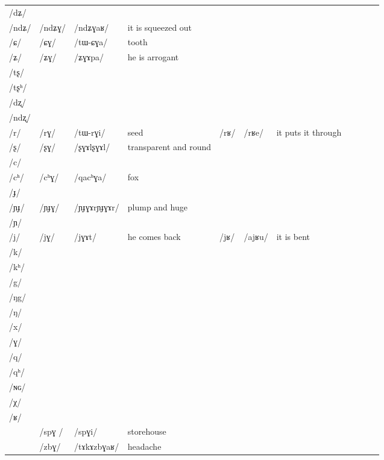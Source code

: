 \documentclass[oldfontcommands,oneside,a4paper,11pt]{article}
\newcommand{\ipa}[1]{{\phon/#1/}} %
\newcommand{\deux}[1]{/#1/}
\newcommand{\trois}[1]{/#1/}
\newcommand{\idph}[1]{\cellcolor{gray}\textbf{#1}}
\begin{document}
\begin{table}
{\begin{tabular}{l|lll|lll|lll|l}
\ipa{dʑ}  	&    	&    	&  	&	&	& \\	
\ipa{ndʑ}  	&  \deux{ndʑɣ}  	&  \ipa{ndʑɣaʁ}  	&  it is squeezed out	&	&	& \\	
\ipa{ɕ}  	&  \deux{ɕɣ}  	&  \ipa{tɯ-ɕɣa}  	&  tooth	&	&	& \\	
\ipa{ʑ}  	&  \deux{ʑɣ}  	&  \ipa{ʑɣɤpa}  	& he is arrogant 	&	&	& \\	
\ipa{tʂ}  	&    	&    	&  	&	&	& \\	
\ipa{tʂʰ}  	&    	&    	&  	&	&	& \\	
\ipa{dʐ}  	&    	&    	&  	&	&	& \\	
\ipa{ndʐ}  	&    	&    	&  	&	&	& \\	
\ipa{r}  	&  \deux{rɣ}  	&  \ipa{tɯ-rɣi}  	&  seed	&\deux{rʁ}	&\ipa{rʁe}	& it puts it through\\	
\ipa{ʂ}  	&  \deux{ʂɣ} \idph{} 	&  \ipa{ʂɣɤlʂɣɤl}  	& transparent and round	&	&	& \\	
\ipa{c}  	&    	&    	&  	&	&	& \\	
\ipa{cʰ}  	&  \deux{cʰɣ}  	&  \ipa{qacʰɣa}  	&fox  	&	&	& \\	
\ipa{ɟ}  	&    	&    	&  	&	&	& \\	
\ipa{ɲɟ}  	&  \deux{ɲɟɣ} \idph{} 	&  \ipa{ɲɟɣɤrɲɟɣɤr}  	&   plump and huge	&	&	& \\	
\ipa{ɲ}  	&    	&    	&  	&	&	& \\	
\ipa{j}  	&  \deux{jɣ}  	&  \ipa{jɣɤt}  	&he comes back  	&\deux{jʁ}	&\ipa{ajʁu}	&it is bent \\	
\ipa{k}  	&    	&    	&  	&	&	& \\	
\ipa{kʰ}  	&    	&    	&  	&	&	& \\	
\ipa{g}  	&    	&    	&  	&	&	& \\	
\ipa{ŋg}  	&    	&    	&  	&	&	& \\	
\ipa{ŋ}  	&    	&    	&  	&	&	& \\	
\ipa{x}  	&    	&    	&  	&	&	& \\	
\ipa{ɣ}  	&    	&    	&  	&	&	& \\	
\ipa{q}  	&    	&    	&  	&	&	& \\	
\ipa{qʰ}  	&    	&    	&  	&	&	& \\	
\ipa{ɴɢ}  	&    	&    	&  	&	&	& \\	
\ipa{χ}  	&    	&    	&  	&	&	& \\	
\ipa{ʁ}  	&    	&    	&  	&	&	& \\	
\midrule						
	&\trois{spɣ }  	&\ipa{spɣi}  	&storehouse	&	&	&\\
	&\trois{zbɣ}  	&\ipa{tɤkɤzbɣaʁ}  	&headache	&	&	&\\

\end{tabular}}
\end{table}
\end{document}
